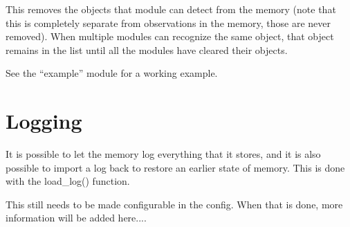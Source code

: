 \documentclass[a4paper, 10pt, oneside]{article}
\begin{document}
This removes the objects that module can detect from the memory (note that this is completely separate from observations in the memory, those are never removed).
When multiple modules can recognize the same object, that object remains in the list until all the modules have cleared their objects.

See the ``example'' module for a working example.

\section{Logging}

It is possible to let the memory log everything that it stores, and it is also possible to import a log back to restore an earlier state of memory.
This is done with the load\_log() function. 

This still needs to be made configurable in the config. When that is done, more information will be added here....
\end{document}
